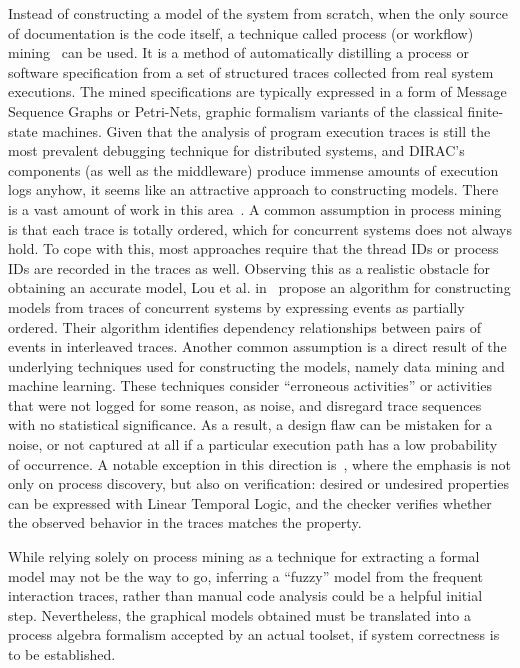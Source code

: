 \documentclass[sort&compress,preprint,3p]{elsarticle}
\begin{document}
Instead of constructing a model of the system from scratch, when the only 
source of documentation is the code itself, a technique called process (or workflow) mining~\cite{Agrawal:1998:MPM:645338.650397}
can be used. It is a method of automatically distilling a process or software specification from a set of 
structured traces collected from real system executions.
The mined specifications are typically expressed in a form of Message Sequence Graphs or Petri-Nets, 
graphic formalism variants of the classical finite-state machines. Given that the 
analysis of program execution traces is still the most prevalent debugging technique
for distributed systems, and DIRAC's components (as well as the middleware) produce
immense amounts of execution logs anyhow, it seems like an attractive approach to constructing models.
There is a vast amount of work in this area~\cite{Aalst:1997:VWN:647744.733919,Lou:2010:MPW:1835804.1835883,Walkinshaw:2008:IFM:1642931.1642962,vanderAalst:2004:WMD:1018031.1018329,Ammons:2002:MS:503272.503275,Kumar:2011:SMC:1985793.1986002}.
A common assumption in process mining is that each trace is totally ordered, 
which for concurrent systems does not always hold. To cope with this, most approaches 
require that the thread IDs or process IDs are recorded in the traces as well.
Observing this as a realistic obstacle for obtaining an accurate model, Lou et al. in~\cite{Lou:2010:MPW:1835804.1835883}
propose an algorithm for constructing models from traces of concurrent systems by expressing events as partially ordered.
Their algorithm identifies dependency relationships between pairs of events in interleaved
traces. Another common assumption is a direct result of the underlying techniques used for constructing the models, namely data mining 
and machine learning. These techniques consider ``erroneous activities'' or activities that
were not logged for some reason, as noise, and disregard trace sequences with no statistical significance.
As a result, a design flaw can be mistaken for a noise, or not captured at all if a particular 
execution path has a low probability of occurrence. A notable exception in this direction is~\cite{vanderAalst:2005:PMV:2099016.2099032}, where the emphasis is not only on process discovery,
but also on verification: desired or undesired properties can be expressed with Linear Temporal Logic, 
and the checker verifies whether the observed behavior in the traces matches the property.

While relying solely on process mining as a technique for extracting a formal model may not be 
the way to go, inferring a ``fuzzy'' model from the frequent interaction traces, rather than manual code analysis
could be a helpful initial step. Nevertheless, the graphical models obtained must be 
translated into a process algebra formalism accepted by an actual toolset, if system correctness is to be established.
\end{document}
